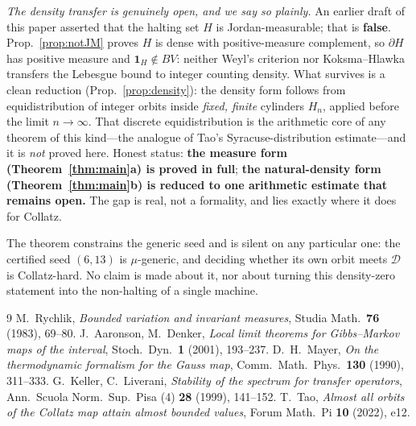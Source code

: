 \documentclass[11pt]{article}
\theoremstyle{definition}\newtheorem{definition}{Definition}
\theoremstyle{remark}\newtheorem{remark}{Remark}
\newcommand{\D}{\mathcal D}\newcommand{\Leb}{\mathrm{Leb}}
\begin{document}
\emph{The density transfer is genuinely open, and we say so plainly.} An
earlier draft of this paper asserted that the halting set $H$ is
Jordan-measurable; that is \textbf{false}. Prop.~\ref{prop:notJM} proves $H$
is dense with positive-measure complement, so $\partial H$ has positive
measure and $\mathbf 1_H\notin BV$: neither Weyl's criterion nor
Koksma--Hlawka transfers the Lebesgue bound to integer counting density. What
survives is a clean reduction (Prop.~\ref{prop:density}): the density form
follows from equidistribution of integer orbits inside \emph{fixed, finite}
cylinders $H_n$, applied before the limit $n\to\infty$. That discrete
equidistribution is the arithmetic core of any theorem of this kind---the
analogue of Tao's Syracuse-distribution estimate---and it is \emph{not}
proved here. Honest status: \textbf{the measure form (Theorem~\ref{thm:main}a)
is proved in full}; \textbf{the natural-density form (Theorem~\ref{thm:main}b)
is reduced to one arithmetic estimate that remains open.} The gap is real,
not a formality, and lies exactly where it does for Collatz.

The theorem constrains the generic seed and is silent on any particular
one: the certified seed $(6,13)$ is $\mu$-generic, and deciding whether its
own orbit meets $\D$ is Collatz-hard. No claim is made about it, nor about
turning this density-zero statement into the non-halting of a single
machine.

\begin{thebibliography}{9}
 M.\ Rychlik, \emph{Bounded variation and invariant measures}, Studia Math.\ \textbf{76} (1983), 69--80.
 J.\ Aaronson, M.\ Denker, \emph{Local limit theorems for Gibbs--Markov maps of the interval}, Stoch.\ Dyn.\ \textbf{1} (2001), 193--237.
 D.\ H.\ Mayer, \emph{On the thermodynamic formalism for the Gauss map}, Comm.\ Math.\ Phys.\ \textbf{130} (1990), 311--333.
 G.\ Keller, C.\ Liverani, \emph{Stability of the spectrum for transfer operators}, Ann.\ Scuola Norm.\ Sup.\ Pisa (4) \textbf{28} (1999), 141--152.
 T.\ Tao, \emph{Almost all orbits of the Collatz map attain almost bounded values}, Forum Math.\ Pi \textbf{10} (2022), e12.
\end{thebibliography}
\end{document}
